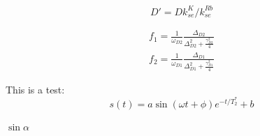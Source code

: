 \documentclass[pdftex,letterpaper,12pt]{report}
\begin{document}
	
\begin{equation}
D'=Dk_{se}^K/k_{se}^{Rb}
\end{equation}

\begin{subequations}\label{fs}
	\begin{gather}
	f_1 = \frac{1}{\omega_{D2}}\frac{\Delta_{D2}}{\Delta_{D2}^2+\frac{\gamma_{D2}^2}{4}}\\
	f_2 = \frac{1}{\omega_{D1}}\frac{\Delta_{D1}}{\Delta_{D1}^2+\frac{\gamma_{D1}^2}{4}}
	\end{gather}
\end{subequations}

This is a test:
\begin{equation}
s(t)=a\sin(\omega t+\phi)e^{-t/T_{2}^{*}}+b
\end{equation}

$\sin \alpha$
\end{document}
